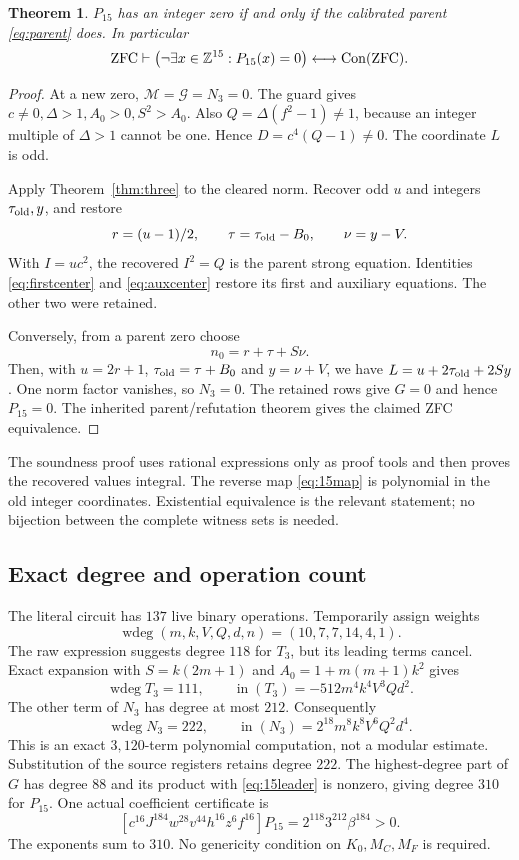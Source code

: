 \documentclass[11pt,letterpaper]{article}
\newtheorem{theorem}{Theorem}[section]
\theoremstyle{remark}\newtheorem{remark}[theorem]{Remark}
\newcommand{\Z}{\mathbb Z}\newcommand{\N}{\mathbb N}\newcommand{\Q}{\mathbb Q}
\newcommand{\Con}{\operatorname{Con}}\newcommand{\Refut}{\operatorname{Ref}}
\newcommand{\degw}{\operatorname{wdeg}}
\begin{document}
\begin{theorem}\label{thm:15}
$P_{15}$ has an integer zero if and only if the calibrated parent
\eqref{eq:parent} does. In particular
\[
 \ZFC\vdash
 \left(\neg\exists x\in\Z^{15}:P_{15}(x)=0\right)
 \longleftrightarrow\Con(\ZFC).
\]
\end{theorem}
\begin{proof}
At a new zero, $\mathcal M=\mathcal G=N_3=0$. The guard gives
$c\ne0,\Delta>1,A_0>0,S^2>A_0$.
Also $Q=\Delta(f^2-1)\ne1$, because an integer multiple of
$\Delta>1$ cannot be one. Hence $D=c^4(Q-1)\ne0$.
The coordinate $L$ is odd.

Apply Theorem~\ref{thm:three} to the cleared norm. Recover odd $u$ and
integers $\tau_{\rm old},y$, and restore
\[
 r=(u-1)/2,\qquad \tau=\tau_{\rm old}-B_0,\qquad \nu=y-V.
\]
With $I=uc^2$, the recovered $I^2=Q$ is the parent strong equation.
Identities \eqref{eq:firstcenter} and \eqref{eq:auxcenter} restore its
first and auxiliary equations. The other two were retained.

Conversely, from a parent zero choose
\begin{equation}\label{eq:15map}n_0=r+\tau+S\nu.\end{equation}
Then, with $u=2r+1$, $\tau_{\rm old}=\tau+B_0$ and $y=\nu+V$,
we have $L=u+2\tau_{\rm old}+2Sy$. One norm factor vanishes, so
$N_3=0$. The retained rows give $G=0$ and hence $P_{15}=0$.
The inherited parent/refutation theorem gives the claimed ZFC equivalence.
\end{proof}

The soundness proof uses rational expressions only as proof tools and
then proves the recovered values integral. The reverse map
\eqref{eq:15map} is polynomial in the old integer coordinates.
Existential equivalence is the relevant statement; no bijection between
the complete witness sets is needed.

\subsection{Exact degree and operation count}
The literal circuit has $137$ live binary operations.
Temporarily assign weights
\[
 \degw(m,k,V,Q,d,n)=(10,7,7,14,4,1).
\]
The raw expression suggests degree $118$ for $T_3$, but its leading
terms cancel. Exact expansion with $S=k(2m+1)$ and
$A_0=1+m(m+1)k^2$ gives
\[
 \degw T_3=111,\qquad
 \operatorname{in}(T_3)=-512m^4k^4V^3Qd^2.
\]
The other term of $N_3$ has degree at most $212$. Consequently
\begin{equation}\label{eq:15leader}
 \degw N_3=222,\qquad
 \operatorname{in}(N_3)=2^{18}m^8k^8V^6Q^2d^4.
\end{equation}
This is an exact $3{,}120$-term polynomial computation, not a modular
estimate. Substitution of the source registers retains degree $222$.
The highest-degree part of $G$ has degree $88$ and its product with
\eqref{eq:15leader} is nonzero, giving degree $310$ for $P_{15}$.
One actual coefficient certificate is
\[
 [c^{16}J^{184}w^{28}v^{44}h^{16}z^6f^{16}]P_{15}
 =2^{118}3^{212}\beta^{184}>0.
\]
The exponents sum to $310$. No genericity condition on $K_0,M_C,M_F$
is required.
\end{document}
